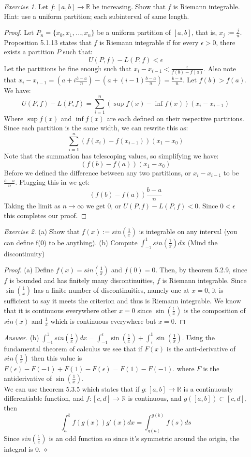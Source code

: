 \documentclass[12pt,oneside]{amsart}
\theoremstyle{definition}
\theoremstyle{remark}
\newtheorem{exer}{Exercise}
\numberwithin{equation}{exer}
\newenvironment{answer}{\bigskip\noindent\emph{Answer.}}{\hfill$\diamond$\newline}
\begin{document}
\newpage
\begin{exer}
Let $f:[a,b]\rightarrow \mathbb{R}$ be increasing. Show that $f$ is Riemann integrable. Hint: use a uniform partition; each subinterval of same length.
\end{exer}
\begin{proof}
Let $P_n=\{x_0,x_1,...,x_n\}$ be a uniform partition of $[a,b]$, that is, $x_j:=\frac{j}{n}$.
Proposition 5.1.13 states that $f$ is Riemann integrable if for every $\epsilon >0$, there exists a partition $P$ such that: $$U(P,f)-L(P,f)<\epsilon$$
Let the partitions be fine enough such that $x_i-x_{i-1}<\frac{\epsilon}{f(b)-f(a)}$. Also note that $x_i-x_{i-1}=(a+i\frac{b-a}{n})-(a+(i-1)\frac{b-a}{n})=\frac{b-a}{n}$. Let $f(b)>f(a)$. We have:
$$U(P,f)-L(P,f)=\sum_{i=1}^{n}(\sup f(x)-\inf f(x))(x_i-x_{i-1})$$
Where $\sup f(x)$ and $\inf f(x)$ are each defined on their respective partitions. Since each partition is the same width, we can rewrite this as:
$$\sum_{i=1}^{n}(f(x_i)-f(x_{i-1}))(x_1-x_0)$$
Note that the summation has telescoping values, so simplifying we have:
$$(f(b)-f(a))(x_1-x_0)$$
Before we defined the difference between any two partitions, or $x_i-x_{i-1}$ to be $\frac{b-a}{n}$. Plugging this in we get:
$$(f(b)-f(a))\frac{b-a}{n}$$
Taking the limit as $n\rightarrow \infty$ we get 0, or $U(P,f)-L(P,f)<0$. Since $0<\epsilon$ this completes our proof.
\end{proof}

\newpage

\begin{exer}
(a) Show that $f(x):=sin(\frac{1}{x})$ is integrable on any interval (you can define f(0) to be anything). (b) Compute $\int_{-1}^{1}sin(\frac{1}{x})dx$ (Mind the discontinuity)
\end{exer}
\begin{proof}
(a) Define $f(x)=sin(\frac{1}{x})$ and $f(0)=0$. Then, by theorem 5.2.9, since $f$ is bounded and has finitely many discontinuities, $f$ is Riemann integrable. Since $\sin(\frac{1}{x})$ has a finite number of discontinuities, namely one at $x=0$, it is sufficient to say it meets the criterion and thus is Riemann integrable. We know that it is continuous everywhere other $x=0$ since $\sin(\frac{1}{x})$ is the composition of $sin(x)$ and $\frac{1}{x}$ which is continuous everywhere but $x=0$.
\end{proof}
\begin{answer}
(b) $\int_{-1}^{1}sin(\frac{1}{x})dx=\int_{-1}^{\epsilon}\sin(\frac{1}{x})+\int_{\epsilon}^{1}\sin(\frac{1}{x})$. Using the fundamental theorem of calculus we see that if $F(x)$ is the anti-derivative of $sin(\frac{1}{x})$ then this value is $F(\epsilon)-F(-1)+F(1)-F(\epsilon)=F(1)-F(-1)$. where $F$ is the antiderivative of $\sin(\frac{1}{x})$.\\
We can use theorem 5.3.5 which states that if $g:[a,b]\rightarrow \mathbb{R}$ is a continuously differentiable function, and $f:[c,d]\rightarrow \mathbb{R}$ is continuous, and $g([a,b])\subset [c,d]$, then $$\int_{a}^{b}f(g(x))g'(x)dx=\int_{g(a)}^{g(b)}f(s)ds$$
Since $sin(\frac{1}{x})$ is an odd function so since it's symmetric around the origin, the integral is 0.
\end{answer}
\end{document}
